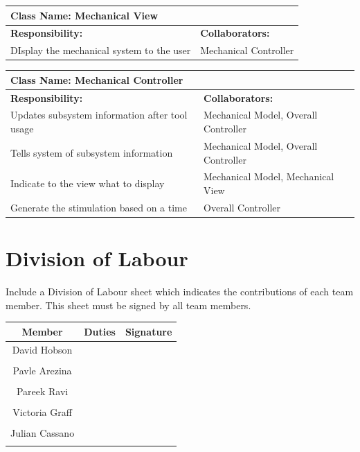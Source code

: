 \documentclass[12pt, titlepage]{article}
\begin{document}
\begin{enumerate}[a)]
	\begin{table}[H]
		\centering
		\begin{tabular}{|p{5cm}|p{5cm}|}
		\hline 
		 \multicolumn{2}{|l|}{\textbf{Class Name: Mechanical View}} \\
		\hline
		\textbf{Responsibility:} & \textbf{Collaborators:} \\
		\hline
		 DIsplay the mechanical system to the user & Mechanical Controller\\
		\hline
		\end{tabular}
	\end{table}

	\begin{table}[H]
		\centering
		\begin{tabular}{|p{5cm}|p{5cm}|}
		\hline 
		 \multicolumn{2}{|l|}{\textbf{Class Name: Mechanical Controller}} \\
		\hline
		\textbf{Responsibility:} & \textbf{Collaborators:} \\
		\hline
		Updates subsystem information after tool usage & Mechanical Model, Overall Controller\\
		\hline
		 Tells system of subsystem information & Mechanical Model, Overall Controller\\
		\hline
		 Indicate to the view what to display & Mechanical Model, Mechanical View\\
		\hline
		 Generate the stimulation based on a time & Overall Controller \\
		\hline
		\end{tabular}
	\end{table}

\end{enumerate}

\appendix
\section{Division of Labour}
\label{sec:division_of_labour}
Include a Division of Labour sheet which indicates the contributions of each team member. This sheet must be signed by all team members.
\begin{table}[h!]
\centering

\begin{tabular}{|c|c|c|}
\hline
{\bf Member} & {\bf Duties}&{\bf Signature}\\
\hline
{David Hobson} & { } & { }\\
{} & {}  & {}\\
\hline
{Pavle Arezina} & {} & {}\\
{} & {} & {}\\
\hline
{Pareek Ravi} & {} & {}\\
{} & {} & {}\\
\hline
{Victoria Graff} & {} & {}\\
{} & {} & {}\\
\hline
{Julian Cassano} & {} & {}\\
{} & {} & {}\\
\hline
\end{tabular}

\end{table}
\end{document}
